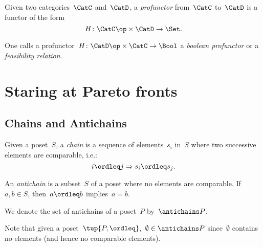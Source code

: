 \begin{shaded}
\begin{definition}[Profunctor]
\label{def:profunctor}
Given two categories~$\CatC$ and~$\CatD$, a \emph{profunctor} from~$\CatC$ to~$\CatD$ is a functor of the form
\begin{equation}
    H\colon \CatC\op \times \CatD \to \Set.
\end{equation}
\end{definition}
\begin{remark}
One calls a profunctor~$H\colon \CatD\op \times \CatC \to \Bool$ a \emph{boolean profunctor} or a \emph{feasibility relation}.
\end{remark} 
\end{shaded}



\clearpage
\section{Staring at Pareto fronts}

\subsection{Chains and Antichains} \label{sec:chains-antichains}


\begin{definition}
\label{def:chain}
Given a poset~$S$, a \emph{chain} is a sequence of elements~${s_i}$ in~$S$ where two successive elements are comparable, i.e.:
\begin{equation}
    i \ordleq j \Rightarrow s_i \ordleq s_j.
\end{equation}
\end{definition}

\begin{definition}
\label{def:antichain}
An \emph{antichain} is a subset~$S$ of a poset where no elements are comparable. If~$a,b \in S$, then~$a \ordleq b$ implies~$a=b$.
\end{definition}
\begin{remark}
We denote the set of antichains of a poset~$P$ by~$\antichains P$.
\end{remark}
\begin{remark}
Note that given a poset~$\tup{P,\ordleq}$,~$\emptyset \in \antichains P$ since~$\emptyset$ contains no elements (and hence no comparable elements).
\end{remark}

